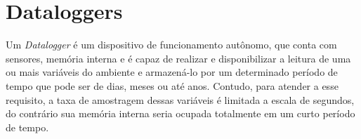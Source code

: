 
















\section{Dataloggers}\label{sec:datalogger}

Um \textit{Datalogger} é um dispositivo de funcionamento autônomo, que conta com sensores, memória interna e é capaz de realizar e disponibilizar a leitura de uma ou mais variáveis do ambiente e armazená-lo por um determinado período de tempo que pode ser de dias, meses ou até anos. Contudo, para atender a esse requisito, a taxa de amostragem dessas variáveis é limitada a escala de segundos, do contrário sua memória interna seria ocupada totalmente em um curto período de tempo.




